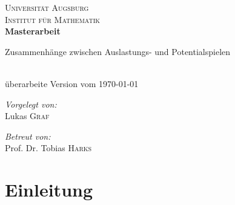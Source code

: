 \documentclass[a4paper,ngerman,11pt,bibliography=totoc]{scrartcl}
\theoremstyle{definition}
\theoremstyle{plain}
\theoremstyle{remark}
\begin{document}
	
	
	

\author{Lukas Graf}
\date{Letzte Aktualisierung: \today}

\thispagestyle{empty}


\begin{titlepage}\centering
	\textsc{\LARGE Universität Augsburg}\\[1cm]
	
	\textsc{\Large Institut für Mathematik}\\[1.5cm]
	
	{\huge \bfseries Masterarbeit \\[1cm]}
	{\Huge{} Zusammenhänge zwischen Auslastungs- und Potentialspielen\\[2cm] \par}

	\graphicspath{{../Bilder/}}\Large\resizebox{.75\textwidth}{!}{}\\[1cm]	

	\small überarbeite Version vom \today

	\vfill
	
	\begin{minipage}{0.4\textwidth}
		\begin{flushleft}\large
			\emph{Vorgelegt von:}\\
			Lukas \textsc{Graf}
		\end{flushleft}
	\end{minipage}
	\begin{minipage}{0.4\textwidth}
		\begin{flushright}\large
			\emph{Betreut von:} \\
			Prof. Dr. Tobias \textsc{Harks}
		\end{flushright}
	\end{minipage}
	
\end{titlepage}


\newpage\null\thispagestyle{empty}\newpage
\tableofcontents
\newpage\null\thispagestyle{empty}\newpage

{}
\section*{Einleitung}
\end{document}
